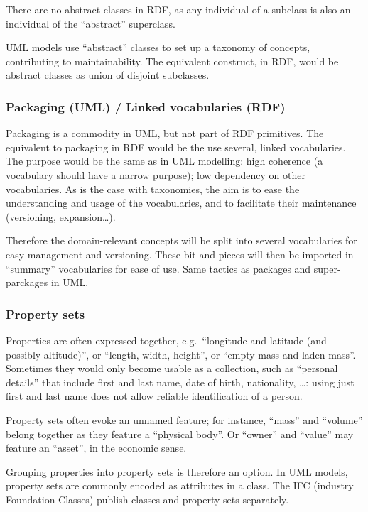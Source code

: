 \documentclass[
  11pt,
]{article}
\begin{document}
There are no abstract classes in RDF, as any individual of a subclass is
also an individual of the ``abstract'' superclass.

UML models use ``abstract'' classes to set up a taxonomy of concepts,
contributing to maintainability. The equivalent construct, in RDF, would
be abstract classes as union of disjoint subclasses.

\hypertarget{packaging-uml-linked-vocabularies-rdf}{%
\subsubsection{Packaging (UML) / Linked vocabularies
(RDF)}\label{packaging-uml-linked-vocabularies-rdf}}

Packaging is a commodity in UML, but not part of RDF primitives. The
equivalent to packaging in RDF would be the use several, linked
vocabularies. The purpose would be the same as in UML modelling: high
coherence (a vocabulary should have a narrow purpose); low dependency on
other vocabularies. As is the case with taxonomies, the aim is to ease
the understanding and usage of the vocabularies, and to facilitate their
maintenance (versioning, expansion\ldots).

Therefore the domain-relevant concepts will be split into several
vocabularies for easy management and versioning. These bit and pieces
will then be imported in ``summary'' vocabularies for ease of use. Same
tactics as packages and super-parckages in UML.

\hypertarget{property-sets}{%
\subsubsection{Property sets}\label{property-sets}}

Properties are often expressed together, e.g.~``longitude and latitude
(and possibly altitude)'', or ``length, width, height'', or ``empty mass
and laden mass''. Sometimes they would only become usable as a
collection, such as ``personal details'' that include first and last
name, date of birth, nationality, \ldots: using just first and last name
does not allow reliable identification of a person.

Property sets often evoke an unnamed feature; for instance, ``mass'' and
``volume'' belong together as they feature a ``physical body''. Or
``owner'' and ``value'' may feature an ``asset'', in the economic sense.

Grouping properties into property sets is therefore an option. In UML
models, property sets are commonly encoded as attributes in a class. The
IFC (industry Foundation Classes) publish classes and property sets
separately.
\end{document}
